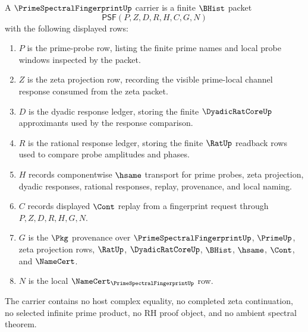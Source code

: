 \begin{definition}
\label{def:prime-spectral-fingerprint-carrier}
A $\PrimeSpectralFingerprintUp$ carrier is a finite $\BHist$ packet
$$
\mathsf{PSF}(P,Z,D,R,H,C,G,N)
$$
with the following displayed rows:
\begin{enumerate}
\item $P$ is the prime-probe row, listing the finite prime names and local probe windows inspected by the packet.
\item $Z$ is the zeta projection row, recording the visible prime-local channel response consumed from the zeta packet.
\item $D$ is the dyadic response ledger, storing the finite $\DyadicRatCoreUp$ approximants used by the response comparison.
\item $R$ is the rational response ledger, storing the finite $\RatUp$ readback rows used to compare probe amplitudes and phases.
\item $H$ records componentwise $\hsame$ transport for prime probes, zeta projection, dyadic responses, rational responses, replay, provenance, and local naming.
\item $C$ records displayed $\Cont$ replay from a fingerprint request through $P,Z,D,R,H,G,N$.
\item $G$ is the $\Pkg$ provenance over $\PrimeSpectralFingerprintUp$, $\PrimeUp$, zeta projection rows, $\RatUp$, $\DyadicRatCoreUp$, $\BHist$, $\hsame$, $\Cont$, and $\NameCert$.
\item $N$ is the local $\NameCert_{\PrimeSpectralFingerprintUp}$ row.
\end{enumerate}
The carrier contains no host complex equality, no completed zeta continuation, no selected infinite prime product, no RH proof object, and no ambient spectral theorem.
\end{definition}

